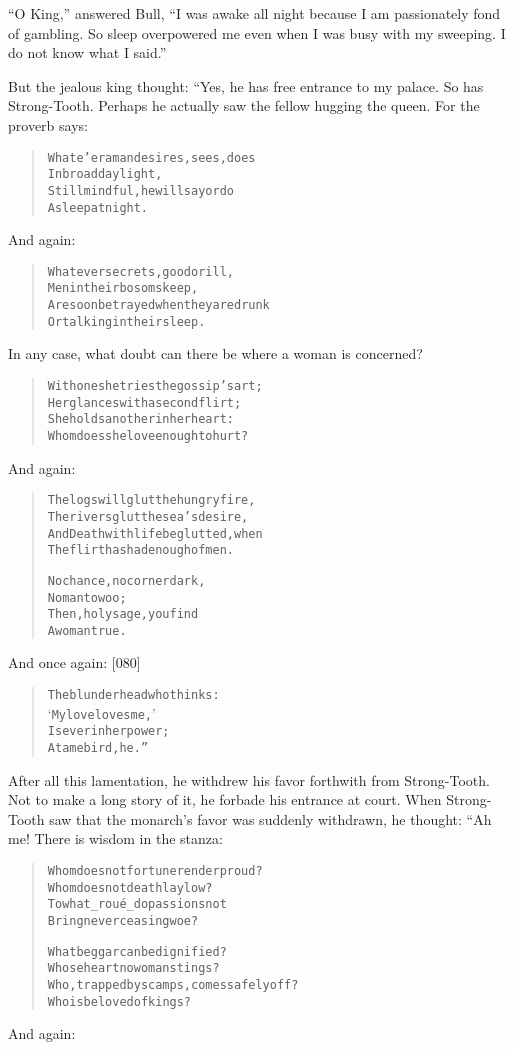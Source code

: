 \documentclass[article, twoside, 14pt]{memoir}
\renewenvironment{verbatim}{%
\begin{quote}%
\vskip -10pt%
\begin{alltt}\normalfont\large}{\end{alltt}%
\end{quote}%
\vskip -10pt
} %
\begin{document}
``O King,'' answered Bull,
``I was awake all night because I am passionately fond of gambling. So sleep overpowered me even when I was busy with my sweeping. I do not know what I said.''

But the jealous king thought: “Yes, he has free entrance to my
palace. So has Strong-Tooth. Perhaps he actually saw the fellow
hugging the queen. For the proverb says:

\begin{verbatim}
Whate'er a man desires, sees, does
    In broad daylight,
Still mindful, he will say or do
    Asleep at night.
\end{verbatim}
And again:

\begin{verbatim}
Whatever secrets, good or ill,
Men in their bosoms keep,
Are soon betrayed when they are drunk
Or talking in their sleep.
\end{verbatim}
In any case, what doubt can there be where a woman is concerned?

\begin{verbatim}
With one she tries the gossip's art;
    Her glances with a second flirt;
She holds another in her heart:
    Whom does she love enough to hurt?
\end{verbatim}
And again:

\begin{verbatim}
The logs will glut the hungry fire,
The rivers glut the sea's desire,
And Death with life be glutted, when
The flirt has had enough of men.

No chance, no corner dark,
    No man to woo;
Then, holy sage, you find
    A woman true.
\end{verbatim}
And once again: [080]

\begin{verbatim}
The blunderhead who thinks:
    ‘My love loves me,’
Is ever in her power;
    A tame bird, he.”
\end{verbatim}
After all this lamentation, he withdrew his favor forthwith from
Strong-Tooth. Not to make a long story of it, he forbade his
entrance at court. When Strong-Tooth saw that the monarch's favor
was suddenly withdrawn, he thought: “Ah me! There is wisdom in the
stanza:

\begin{verbatim}
Whom does not fortune render proud?
    Whom does not death lay low?
To what _roué_ do passions not
    Bring never ceasing woe?

What beggar can be dignified?
    Whose heart no woman stings?
Who, trapped by scamps, comes safely off?
    Who is beloved of kings?
\end{verbatim}
And again:
\end{document}
